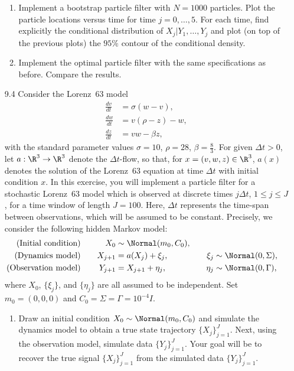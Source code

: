 \begin{enumerate}
\begin{enumerate}[label=\alph*)]
  \item Implement a bootstrap particle filter with $N = 1000$ particles. Plot the
    particle locations versus time for time $j = 0, \ldots, 5$. For each time, find
    explicitly the conditional distribution of $X_j | Y_1, \ldots, Y_j$ and plot (on top
    of the previous plots) the $95\%$ contour of the conditional density.

  \item Implement the optimal particle filter with the same specifications as before.
    Compare the results.
\end{enumerate}

\item[9.4] Consider the Lorenz~63 model
\begin{align*}
  \frac{dv}{dt} &= \sigma(w - v), \\
  \frac{dw}{dt} &= v(\rho - z) - w, \\
  \frac{dz}{dt} &= vw - \beta z,
\end{align*}
with the standard parameter values $\sigma = 10$, $\rho = 28$, $\beta = \frac{8}{3}$.
For given $\Delta t > 0$, let $a : \R^3 \to \R^3$ denote the $\Delta t$-flow, so that,
for $x = (v, w, z) \in \R^3$, $a(x)$ denotes the solution of the Lorenz~63 equation at
time $\Delta t$ with initial condition $x$. In this exercise, you will implement a
particle filter for a stochastic Lorenz~63 model which is observed at discrete times
$j\Delta t$, $1 \leq j \leq J$, for a time window of length $J = 100$. Here, $\Delta t$
represents the time-span between observations, which will be assumed to be constant.
Precisely, we consider the following hidden Markov model:
\begin{alignat*}{3}
  \text{(Initial condition)}  &\quad& X_0 &\sim \Normal(m_0, C_0), \\
  \text{(Dynamics model)}     &\quad& X_{j+1} &= a(X_j) + \xi_j, &\quad
    \xi_j &\sim \Normal(0, \Sigma), \\
  \text{(Observation model)}  &\quad& Y_{j+1} &= X_{j+1} + \eta_j, &\quad
    \eta_j &\sim \Normal(0, \Gamma),
\end{alignat*}
where $X_0$, $\{\xi_j\}$, and $\{\eta_j\}$ are all assumed to be independent. Set
$m_0 = (0, 0, 0)$ and $C_0 = \Sigma = \Gamma = 10^{-4} I$.

\begin{enumerate}[label=\alph*)]
  \item Draw an initial condition $X_0 \sim \Normal(m_0, C_0)$ and simulate the dynamics
    model to obtain a true state trajectory $\{X_j\}_{j=1}^{J}$. Next, using the
    observation model, simulate data $\{Y_j\}_{j=1}^{J}$. Your goal will be to recover
    the true signal $\{X_j\}_{j=1}^{J}$ from the simulated data $\{Y_j\}_{j=1}^{J}$.


\end{enumerate}
\end{enumerate}
